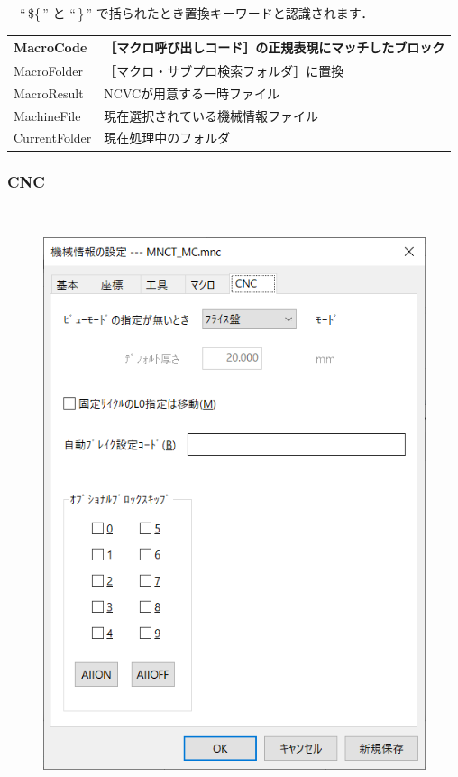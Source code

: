 \newpage %
　``\,\$\{\,'' と ``\,\}\,'' で括られたとき置換キーワードと認識されます．
\begin{table}[H]
\centering
\begin{tabular}{|p{3cm}|p{10cm}|}
\hline
MacroCode     & ［マクロ呼び出しコード］の正規表現にマッチしたブロック \\ \hline
MacroFolder   & ［マクロ・サブプロ検索フォルダ］に置換 \\ \hline
MacroResult   & NCVCが用意する一時ファイル \\ \hline
MachineFile   & 現在選択されている機械情報ファイル \\ \hline
CurrentFolder & 現在処理中のフォルダ \\ \hline
\end{tabular}
\end{table}

\subsubsection{CNC}
\begin{minipage}[t]{0.5\textwidth}
　
\end{minipage}
\begin{minipage}[t]{0.5\textwidth}
\vspace*{-2zh}
\begin{figure}[H]
\centering
\includegraphics[scale=0.7]{No6/fig/machine5.png}
\label{fig:machine5.png}
\end{figure}
\end{minipage}
